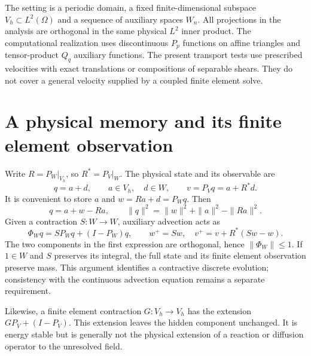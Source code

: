 \documentclass[10pt,a4paper]{article}
\newcommand{\V}{V_h}
\newcommand{\PV}{P_V}
\newcommand{\PW}{P_W}
\begin{document}
The setting is a periodic domain, a fixed finite-dimensional subspace
$\V\subset L^2(\Omega)$ and a sequence of auxiliary spaces $W_n$.
All projections in the analysis are orthogonal in the same physical
$L^2$ inner product. The computational realization uses discontinuous
$P_p$ functions on affine triangles and tensor-product $Q_q$ auxiliary
functions. The present transport tests use prescribed velocities with
exact translations or compositions of separable shears. They do not
cover a general velocity supplied by a coupled finite element solve.

\section{A physical memory and its finite element observation}
Write $R=\PW|_{\V}$, so $R^*=\PV|_W$. The physical state and its
observable are
\begin{equation}
 q=a+d,\qquad a\in\V,\quad d\in W,\qquad v=\PV q=a+R^*d.
\end{equation}
It is convenient to store $a$ and $w=Ra+d=\PW q$. Then
\begin{equation}\label{eq:energy}
 q=a+w-Ra,\qquad
 \|q\|^2=\|w\|^2+\|a\|^2-\|Ra\|^2.
\end{equation}
Given a contraction $S:W\to W$, auxiliary advection acts as
\begin{equation}\label{eq:transport}
 \Phi_W q=S\PW q+(I-\PW)q,\qquad
 w^+=Sw,\quad v^+=v+R^*(Sw-w).
\end{equation}
The two components in the first expression are orthogonal, hence
$\|\Phi_W\|\leq1$. If $1\in W$ and $S$ preserves its integral,
the full state and its finite element observation preserve mass.
This argument identifies a contractive discrete evolution; consistency
with the continuous advection equation remains a separate requirement.

Likewise, a finite element contraction $G:\V\to\V$ has the extension
$G\PV+(I-\PV)$. This extension leaves the hidden component unchanged.
It is energy stable but is generally not the physical extension of a
reaction or diffusion operator to the unresolved field.
\end{document}
